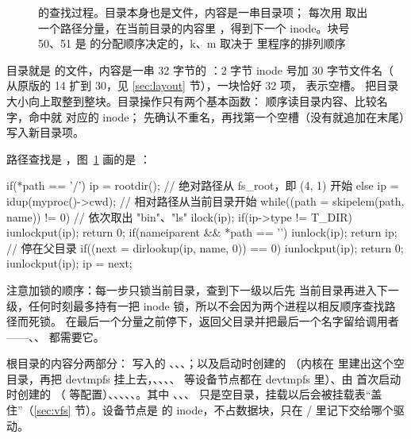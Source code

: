 \begin{figure}[htbp]
  \caption{ 的查找过程。目录本身也是文件，内容是一串目录项； 每次用  取出一个路径分量，在当前目录的内容里 ，得到下一个 inode。块号 50、51 是  的分配顺序决定的，k、m 取决于  里程序的排列顺序}
  \label{fig:xv6-namei}
\end{figure}

目录就是  的文件，内容是一串 32 字节的 ：2 字节 inode 号加 30 字节文件名（ 从原版的 14 扩到 30，见 \ref{sec:layout} 节），一块恰好 32 项， 表示空槽。 把目录大小向上取整到整块。目录操作只有两个基本函数： 顺序读目录内容、比较名字，命中就  对应的 inode； 先确认不重名，再找第一个空槽（没有就追加在末尾）写入新目录项。

路径查找是 ，图~\ref{fig:xv6-namei} 画的是 ：

\begin{ccode}
if(*path == '/') ip = rootdir();                      // 绝对路径从 fs_root，即 (4, 1) 开始
else             ip = idup(myproc()->cwd);            // 相对路径从当前目录开始
while((path = skipelem(path, name)) != 0){           // 依次取出 "bin"、"ls"
  ilock(ip);
  if(ip->type != T_DIR){ iunlockput(ip); return 0; }
  if(nameiparent && *path == '\0'){ iunlock(ip); return ip; }   // 停在父目录
  if((next = dirlookup(ip, name, 0)) == 0){ iunlockput(ip); return 0; }
  iunlockput(ip);
  ip = next;
}
\end{ccode}

注意加锁的顺序：每一步只锁当前目录，查到下一级以后先  当前目录再进入下一级，任何时刻最多持有一把 inode 锁，所以不会因为两个进程以相反顺序查找路径而死锁。 在最后一个分量之前停下，返回父目录并把最后一个名字留给调用者——、、 都需要它。

根目录的内容分两部分： 写入的 、、、；以及启动时创建的 （内核在  里建出这个空目录，再把 devtmpfs 挂上去，、、、、 等设备节点都在 devtmpfs 里）、由  首次启动时创建的 （ 等配置）、、、、、。其中 、、、 只是空目录，挂载以后会被挂载表“盖住”（\ref{sec:vfs} 节）。设备节点是  的 inode，不占数据块，只在 / 里记下交给哪个驱动。

